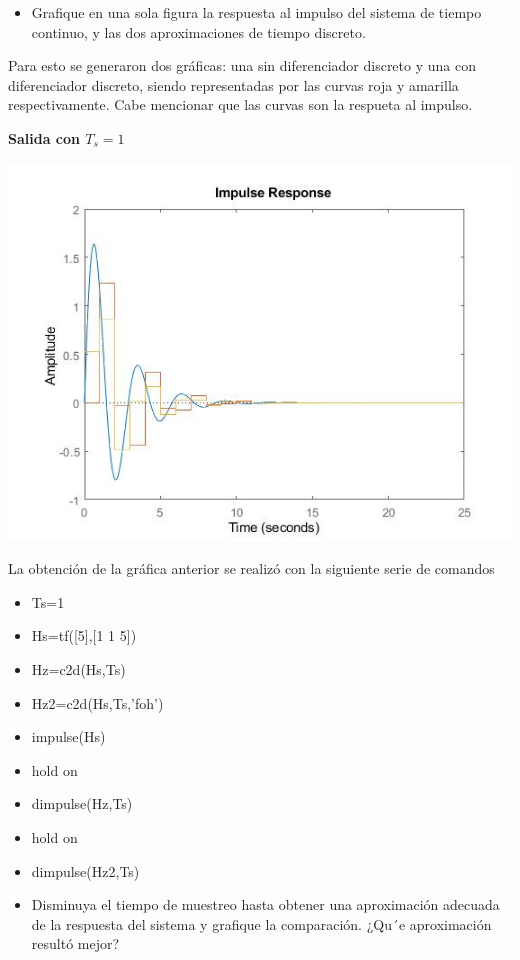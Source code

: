 \begin{itemize}
	\item Grafique en una sola figura la respuesta al impulso del sistema de tiempo continuo, y las dos aproximaciones
	de tiempo discreto.
\end{itemize}

Para esto se generaron dos gráficas: una sin diferenciador discreto y una con diferenciador discreto, siendo representadas por las curvas roja y amarilla respectivamente. Cabe mencionar que las curvas son la respueta al impulso.

\noindent \textbf{Salida con $T_s=1$}

\noindent \includegraphics[scale=0.6]{./ImagenParte1y2/SalidaTs1DosHz}

La obtención de la gráfica anterior se realizó con la siguiente serie de comandos

\begin{itemize}
\item Ts=1
\item Hs=tf([5],[1 1 5])
\item Hz=c2d(Hs,Ts)
\item Hz2=c2d(Hs,Ts,'foh')
\item impulse(Hs)
\item hold on
\item dimpulse(Hz,Ts)
\item hold on
\item dimpulse(Hz2,Ts)
\end{itemize}

\begin{itemize}
	\item Disminuya el tiempo de muestreo hasta obtener una aproximación adecuada de la respuesta del sistema
	y grafique la comparación. ¿Qu´e aproximación resultó mejor?
\end{itemize}

